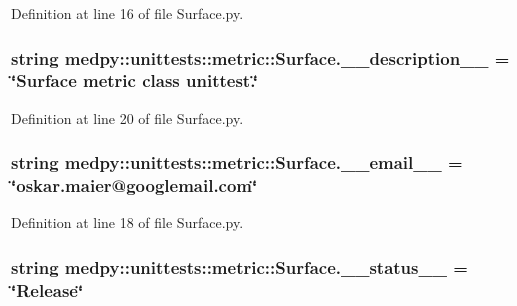 Definition at line 16 of file Surface.py.

\hypertarget{namespacemedpy_1_1unittests_1_1metric_1_1Surface_a93a669867ec52b47e2d765f042753f20}{
\subsubsection[{\_\-\_\-description\_\-\_\-}]{\setlength{\rightskip}{0pt plus 5cm}string {\bf medpy::unittests::metric::Surface.\_\-\_\-description\_\-\_\-} = \char`\"{}Surface metric class unittest.\char`\"{}}}
\label{namespacemedpy_1_1unittests_1_1metric_1_1Surface_a93a669867ec52b47e2d765f042753f20}


Definition at line 20 of file Surface.py.

\hypertarget{namespacemedpy_1_1unittests_1_1metric_1_1Surface_a26aab81b5eee1872944e4e6d8e16be84}{
\subsubsection[{\_\-\_\-email\_\-\_\-}]{\setlength{\rightskip}{0pt plus 5cm}string {\bf medpy::unittests::metric::Surface.\_\-\_\-email\_\-\_\-} = \char`\"{}oskar.maier@googlemail.com\char`\"{}}}
\label{namespacemedpy_1_1unittests_1_1metric_1_1Surface_a26aab81b5eee1872944e4e6d8e16be84}


Definition at line 18 of file Surface.py.

\hypertarget{namespacemedpy_1_1unittests_1_1metric_1_1Surface_a8b53340057370b0f215a4e1f8e2e47ad}{
\subsubsection[{\_\-\_\-status\_\-\_\-}]{\setlength{\rightskip}{0pt plus 5cm}string {\bf medpy::unittests::metric::Surface.\_\-\_\-status\_\-\_\-} = \char`\"{}Release\char`\"{}}}
\label{namespacemedpy_1_1unittests_1_1metric_1_1Surface_a8b53340057370b0f215a4e1f8e2e47ad}


